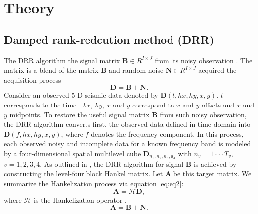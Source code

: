 \section{Theory}

\subsection{Damped rank-redcution method (DRR)}

The DRR algorithm  the signal matrix $\mathbf{B}\in R^{I \times J}$ from its noisy observation . The matrix   is a blend of the matrix $\mathbf{B}$ and random noise $\mathbf{N}\in R^{I \times J}$ acquired  the acquisition process
\begin{equation}
\mathbf{D} = \mathbf{B}+\mathbf{N}.  
\label{eq:eq1}                  
\end{equation}
Consider an observed 5-D seismic data denoted by $\mathbf{D}(t, hx, hy, x, y)$. $t$ corresponds to the time . $hx$, $hy$, $x$ and $y$ correspond to $x$ and $y$ offsets and $x$ and $y$ midpoints. To restore the useful signal matrix $\mathbf{B}$ from such noisy observation, the DRR algorithm converts first, the observed data defined in time domain into $\mathbf{D}(f, hx, hy, x, y)$, where $f$ denotes the frequency component. In this process, each observed noisy and incomplete data for a known frequency band is modeled by a four-dimensional spatial multilevel cube $\mathbf{D}_{n_1,n_2,n_3,n_4}$ with $n_v = 1 \cdot\cdot\cdot T_v$, {$v = 1,2,3,4$}. As outlined in \cite{chen2016simultaneous}, the DRR algorithm for  signal $\mathbf{B}$ is achieved by constructing the level-four block Hankel matrix. Let {$\textbf{A}$} be this target matrix. We summarize the Hankelization process via equation \ref{eq:eq2}:
\begin{equation}
\mathbf{A}={\mathcal{H}}\mathbf{D},     
\label{eq:eq2}               
\end{equation}
where ${\mathcal{H}}$ is the Hankelization operator \citep{oropeza2011simultaneous,chen2016simultaneous}. 
\begin{equation}
\mathbf{A} = \mathbf{B}+\mathbf{N}.  
\label{eq:eq3}                  
\end{equation}
